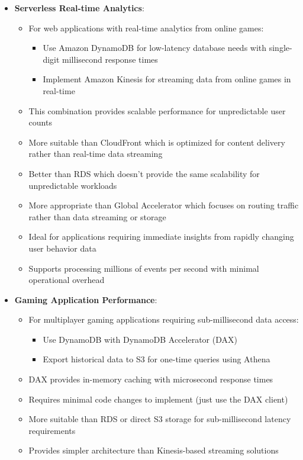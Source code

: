 \documentclass[11pt,a4paper]{report}
\begin{document}
\begin{itemize}
\begin{itemize}
  \item Better solution than adding throttling on API Gateway which may reject user requests
  \item More effective than using DynamoDB Accelerator (DAX) which improves read performance but doesn't buffer writes
  \item More appropriate than creating secondary indexes which don't address write throughput limitations
\end{itemize}
  \item \textbf{Serverless Real-time Analytics}:
\begin{itemize}
  \item For web applications with real-time analytics from online games:
\begin{itemize}
  \item Use Amazon DynamoDB for low-latency database needs with single-digit millisecond response times
  \item Implement Amazon Kinesis for streaming data from online games in real-time
\end{itemize}
  \item This combination provides scalable performance for unpredictable user counts
  \item More suitable than CloudFront which is optimized for content delivery rather than real-time data streaming
  \item Better than RDS which doesn't provide the same scalability for unpredictable workloads
  \item More appropriate than Global Accelerator which focuses on routing traffic rather than data streaming or storage
  \item Ideal for applications requiring immediate insights from rapidly changing user behavior data
  \item Supports processing millions of events per second with minimal operational overhead
\end{itemize}
  \item \textbf{Gaming Application Performance}:
\begin{itemize}
  \item For multiplayer gaming applications requiring sub-millisecond data access:
\begin{itemize}
  \item Use DynamoDB with DynamoDB Accelerator (DAX)
  \item Export historical data to S3 for one-time queries using Athena
\end{itemize}
  \item DAX provides in-memory caching with microsecond response times
  \item Requires minimal code changes to implement (just use the DAX client)
  \item More suitable than RDS or direct S3 storage for sub-millisecond latency requirements
  \item Provides simpler architecture than Kinesis-based streaming solutions
\end{itemize}
\end{itemize}
\end{document}
